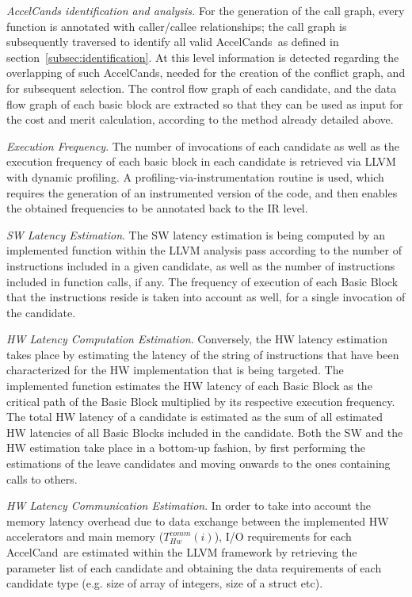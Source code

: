 \documentclass[]{usiinfthesis}
\newcommand{\candidate}{{AccelCand}}
\newcommand{\candidates}{{AccelCand}s}
\begin{document}
\emph{AccelCands identification and analysis.} For the generation of
the call graph, every function is annotated with caller/callee relationships; 
the call graph is subsequently traversed to identify all valid \candidates\ as 
defined in section~\ref{subsec:identification}. At this level information is 
detected regarding the overlapping of such \candidates, needed for the creation 
of the conflict graph, and for subsequent selection. The control flow graph of 
each candidate, and the data flow graph of each basic block are extracted so 
that they can be used as input for the cost and merit calculation, according to 
the method already detailed above.\par

\emph{Execution Frequency}.  The number of invocations of each
candidate as well as the execution frequency of each basic block in
each candidate is retrieved via LLVM with dynamic profiling. A
profiling-via-instrumentation routine is used, which requires the generation
of an instrumented version of the code, and then enables the obtained
frequencies to be annotated back to the IR level.\par

\emph{SW Latency Estimation}. The SW latency estimation is being
computed by an implemented function within the LLVM analysis pass
according to the number of instructions included in a given candidate,
as well as the number of instructions included in function calls, if
any. The frequency of execution of each Basic Block that the
instructions reside is taken into account as well, for a single
invocation of the candidate.\par

\emph{HW Latency Computation Estimation}. Conversely, the HW latency
estimation takes place by estimating the latency of the string of
instructions that have been characterized for the HW implementation
that is being targeted. The implemented function estimates the HW
latency of each Basic Block as the critical path of the Basic Block
multiplied by its respective execution frequency. The total HW latency
of a candidate is estimated as the
sum of all estimated HW latencies of all Basic Blocks included in the candidate. 
Both the SW and the HW estimation take place in a bottom-up fashion,
by first performing the estimations of the leave candidates and moving
onwards to the ones containing calls to others.\par

\emph{HW Latency Communication Estimation}. In order to take into
account the memory latency overhead due to data exchange between the
implemented HW accelerators and main memory ($T_{Hw}^{comm}(i)$), 
I/O requirements for each \candidate\ are
estimated within the LLVM framework by retrieving the parameter list
of each candidate and obtaining the data requirements of
each candidate type (e.g. size of array of integers, size of a struct etc).\par
\end{document}
